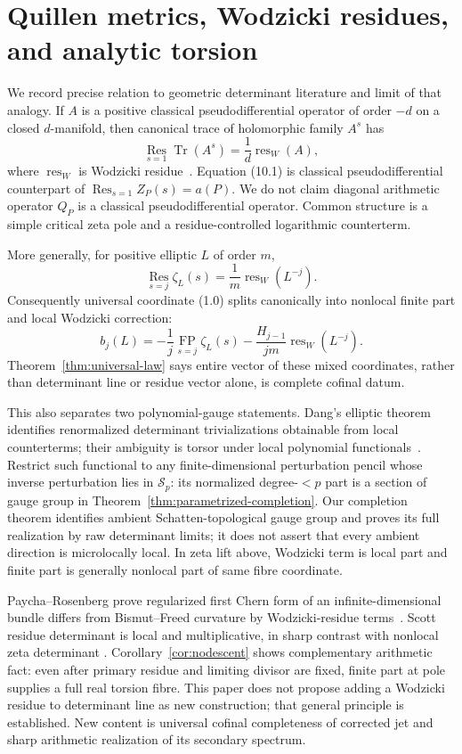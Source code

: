\documentclass[11pt]{article}
\theoremstyle{definition}
\theoremstyle{remark}
\newcommand{\Res}{\operatorname*{Res}}
\newcommand{\FP}{\operatorname*{FP}}
\newcommand{\Tr}{\operatorname{Tr}}
\begin{document}
\section{Quillen metrics, Wodzicki residues, and analytic torsion}
\label{sec:geometry}

We record precise relation to geometric determinant literature and limit of that analogy.  If
$A$ is a positive classical pseudodifferential operator of order $-d$ on a closed $d$-manifold,
then canonical trace of holomorphic family $A^s$ has
\begin{equation}
 \Res_{s=1}\Tr(A^s)=\frac1d\operatorname{res}_W(A),        \tag{10.1}
\end{equation}
where $\operatorname{res}_W$ is Wodzicki residue~\cite{PaychaScott2007}.  Equation (10.1) is classical
pseudodifferential counterpart of $\Res_{s=1}Z_P(s)=a(P)$.  We do not claim diagonal arithmetic
operator $Q_P$ is a classical pseudodifferential operator.  Common structure is a simple critical
zeta pole and a residue-controlled logarithmic counterterm.

More generally, for positive elliptic $L$ of order $m$,
\[
 \Res_{s=j}\zeta_L(s)=\frac1m\operatorname{res}_W(L^{-j}).
\]
Consequently universal coordinate (1.0) splits canonically into nonlocal finite part and local
Wodzicki correction:
\[
 b_j(L)=-\frac1j\FP_{s=j}\zeta_L(s)
        -\frac{H_{j-1}}{jm}\operatorname{res}_W(L^{-j}).
\]
Theorem~\ref{thm:universal-law} says entire vector of these mixed coordinates, rather than
determinant line or residue vector alone, is complete cofinal datum.

This also separates two polynomial-gauge statements.  Dang's elliptic theorem identifies
renormalized determinant trivializations obtainable from local counterterms; their ambiguity is
torsor under local polynomial functionals~\cite{Dang2022}.  Restrict such functional to any
finite-dimensional perturbation pencil whose inverse perturbation lies in $\mathcal S_p$: its
normalized degree-$<p$ part is a section of gauge group in
Theorem~\ref{thm:parametrized-completion}.  Our completion theorem identifies ambient
Schatten-topological gauge group and proves its full realization by raw determinant limits; it
does not assert that every ambient direction is microlocally local.  In zeta lift above,
Wodzicki term is local part and finite part is generally nonlocal part of same fibre coordinate.

Paycha--Rosenberg prove regularized first Chern form of an infinite-dimensional bundle differs
from Bismut--Freed curvature by Wodzicki-residue terms~\cite{PaychaRosenberg2000}.  Scott residue
determinant is local and multiplicative, in sharp contrast with nonlocal zeta determinant
\cite{Scott2005}.  Corollary~\ref{cor:nodescent} shows complementary arithmetic fact: even after
primary residue and limiting divisor are fixed, finite part at pole supplies a full real torsion
fibre.  This paper does not propose adding a Wodzicki residue to determinant line as new
construction; that general principle is established.  New content is universal cofinal
completeness of corrected jet and sharp arithmetic realization of its secondary spectrum.
\end{document}
